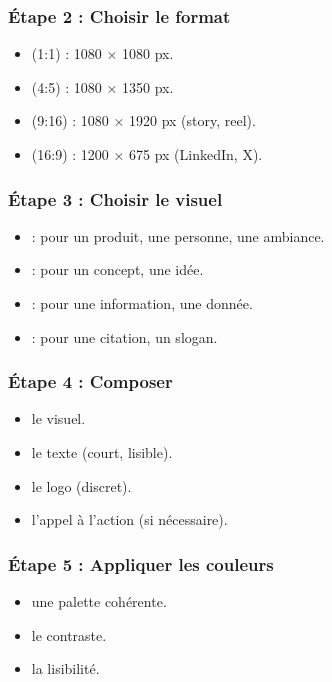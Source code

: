 \subsubsection{Étape 2 : Choisir le format}

\begin{itemize}
    \item {} (1:1) : 1080 × 1080 px.
    \item {} (4:5) : 1080 × 1350 px.
    \item {} (9:16) : 1080 × 1920 px (story, reel).
    \item {} (16:9) : 1200 × 675 px (LinkedIn, X).
\end{itemize}

\subsubsection{Étape 3 : Choisir le visuel}

\begin{itemize}
    \item {} : pour un produit, une personne, une ambiance.
    \item {} : pour un concept, une idée.
    \item {} : pour une information, une donnée.
    \item {} : pour une citation, un slogan.
\end{itemize}

\subsubsection{Étape 4 : Composer}

\begin{itemize}
    \item {} le visuel.
    \item {} le texte (court, lisible).
    \item {} le logo (discret).
    \item {} l'appel à l'action (si nécessaire).
\end{itemize}

\subsubsection{Étape 5 : Appliquer les couleurs}

\begin{itemize}
    \item {} une palette cohérente.
    \item {} le contraste.
    \item {} la lisibilité.
\end{itemize}

